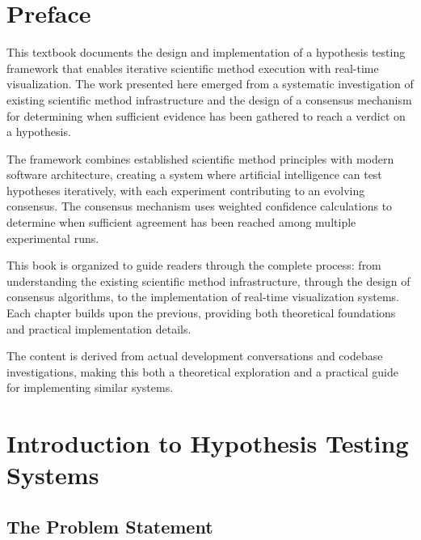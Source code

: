 \documentclass{book}
\begin{document}
\addtocounter{page}{2}

\chapter*{Preface}

This textbook documents the design and implementation of a hypothesis testing framework that enables iterative scientific method execution with real-time visualization. The work presented here emerged from a systematic investigation of existing scientific method infrastructure and the design of a consensus mechanism for determining when sufficient evidence has been gathered to reach a verdict on a hypothesis.

The framework combines established scientific method principles with modern software architecture, creating a system where artificial intelligence can test hypotheses iteratively, with each experiment contributing to an evolving consensus. The consensus mechanism uses weighted confidence calculations to determine when sufficient agreement has been reached among multiple experimental runs.

This book is organized to guide readers through the complete process: from understanding the existing scientific method infrastructure, through the design of consensus algorithms, to the implementation of real-time visualization systems. Each chapter builds upon the previous, providing both theoretical foundations and practical implementation details.

The content is derived from actual development conversations and codebase investigations, making this both a theoretical exploration and a practical guide for implementing similar systems.

\setcounter{tocdepth}{3}
\tableofcontents

\mainmatter

\chapter{Introduction to Hypothesis Testing Systems}

\section{The Problem Statement}
\end{document}
